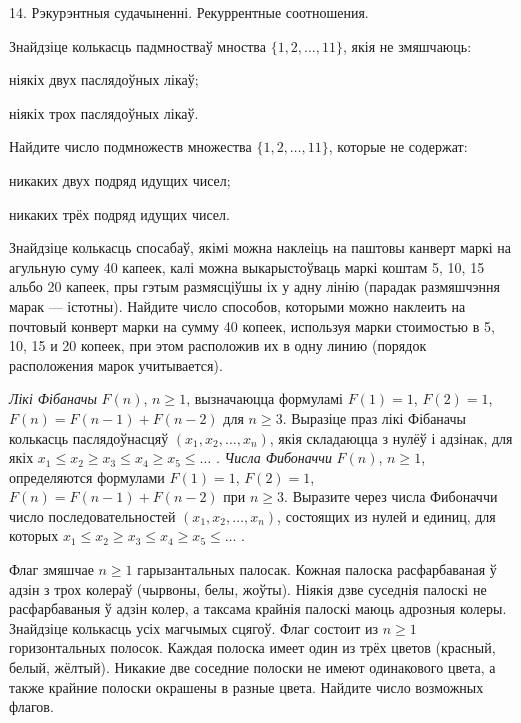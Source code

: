 



\biLangHeader
{14. Рэкурэнтныя судачыненні.}
{Рекуррентные соотношения.}

\begin{problemList}

\problemItemSimple
{Знайдзіце колькасць падмностваў мноства $\{1, 2, \ldots, 11\}$, якія не змяшчаюць:
\begin{belarusianEnumerate}
  \item ніякіх двух паслядоўных лікаў;
  \item ніякіх трох паслядоўных лікаў.
\end{belarusianEnumerate}}
{Найдите число подмножеств множества $\{1, 2, \ldots, 11\}$, которые не содержат:
\begin{belarusianEnumerate}
  \item никаких двух подряд идущих чисел;
  \item никаких трёх подряд идущих чисел.
\end{belarusianEnumerate}}

\bigskip

\problemItemSimple
{Знайдзіце колькасць спосабаў, якімі можна наклеіць на паштовы канверт маркі на
агульную суму 40 капеек, калі можна выкарыстоўваць маркі коштам 5, 10, 15 альбо 20 капеек,
пры гэтым размясціўшы іх у адну лінію (парадак размяшчэння марак --- істотны).}
{Найдите число способов, которыми можно наклеить на почтовый конверт
марки на сумму 40 копеек, используя марки стоимостью в 5, 10, 15 и 20 копеек,
при этом расположив их в одну линию (порядок расположения марок учитывается).}

\bigskip

\problemItemSimple
{\emph{Лікі Фібаначы} $F(n)$, $n \ge 1$, вызначаюцца формуламі
$F(1) = 1$, $F(2) = 1$, $F(n) = F(n - 1) + F(n - 2)$ для $n \ge 3$.
Выразіце праз лікі Фібаначы колькасць паслядоўнасцяў $(x_1, x_2, \ldots, x_n)$,
якія складаюцца з нулёў і адзінак, для якіх
$x_1 \le x_2 \ge x_3 \le x_4 \ge x_5 \le \ldots\,\,$.}
{\emph{Числа Фибоначчи} $F(n)$, $n \ge 1$, определяются формулами
$F(1) = 1$, $F(2) = 1$, $F(n) = F(n - 1) + F(n - 2)$ при $n \ge 3$. Выразите
через числа Фибоначчи число последовательностей $(x_1, x_2, \ldots, x_n)$,
состоящих из нулей и единиц, для которых
$x_1 \le x_2 \ge x_3 \le x_4 \ge x_5 \le \ldots\,\,$.}

\bigskip

\problemItemSimple
{Флаг змяшчае $n \ge 1$ гарызантальных палосак. Кожная палоска расфарбаваная ў адзін з трох колераў (чырвоны, белы, жоўты).
Ніякія дзве суседнія палоскі не расфарбаваныя ў адзін колер, а таксама крайнія палоскі маюць адрозныя колеры.
Знайдзіце колькасць усіх магчымых сцягоў.}
{Флаг состоит из $n \ge 1$ горизонтальных полосок. Каждая полоска
имеет один из трёх цветов (красный, белый, жёлтый). Никакие две соседние полоски
не имеют одинакового цвета, а также крайние полоски окрашены в разные цвета.
Найдите число возможных флагов.}


\end{problemList}
